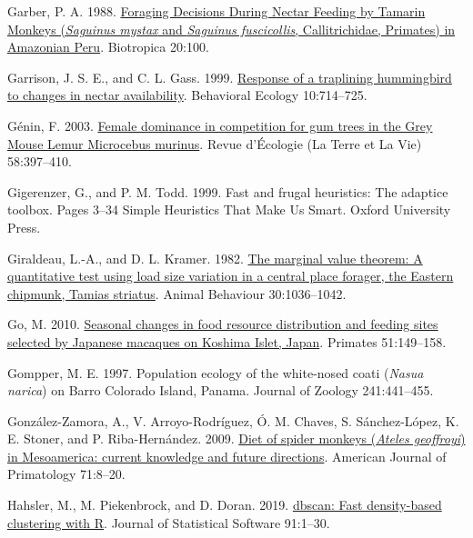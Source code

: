 \documentclass[twoside,12pt,final]{ucthesis-CA2012}
\newenvironment{CSLReferences}%
  {}%
  {\par}
\begin{document}
\begin{ucmainmatter}
\begin{CSLReferences}{1}{0}
\leavevmode{}%
Garber, P. A. 1988. \href{https://doi.org/10.2307/2388181}{Foraging Decisions During Nectar Feeding by Tamarin Monkeys (\emph{Saguinus mystax} and \emph{Saguinus fuscicollis}, Callitrichidae, Primates) in Amazonian Peru}. Biotropica 20:100.

\leavevmode{}%
Garrison, J. S. E., and C. L. Gass. 1999. \href{https://doi.org/10.1093/beheco/10.6.714}{Response of a traplining hummingbird to changes in nectar availability}. Behavioral Ecology 10:714--725.

\leavevmode{}%
Génin, F. 2003. \href{https://doi.org/10.3406/revec.2003.5340}{Female dominance in competition for gum trees in the Grey Mouse Lemur Microcebus murinus}. Revue d'Écologie (La Terre et La Vie) 58:397--410.

\leavevmode{}%
Gigerenzer, G., and P. M. Todd. 1999. Fast and frugal heuristics: The adaptice toolbox. Pages 3--34 Simple Heuristics That Make Us Smart. Oxford University Press.

\leavevmode{}%
Giraldeau, L.-A., and D. L. Kramer. 1982. \href{https://doi.org/10.1016/S0003-3472(82)80193-0}{The marginal value theorem: A quantitative test using load size variation in a central place forager, the Eastern chipmunk, Tamias striatus}. Animal Behaviour 30:1036--1042.

\leavevmode{}%
Go, M. 2010. \href{https://doi.org/10.1007/s10329-009-0179-5}{Seasonal changes in food resource distribution and feeding sites selected by Japanese macaques on Koshima Islet, Japan}. Primates 51:149--158.

\leavevmode{}%
Gompper, M. E. 1997. Population ecology of the white-nosed coati (\emph{Nasua narica}) on Barro Colorado Island, Panama. Journal of Zoology 241:441--455.

\leavevmode{}%
González-Zamora, A., V. Arroyo-Rodríguez, Ó. M. Chaves, S. Sánchez-López, K. E. Stoner, and P. Riba-Hernández. 2009. \href{https://doi.org/10.1002/ajp.20625}{Diet of spider monkeys (\emph{Ateles geoffroyi}) in Mesoamerica: current knowledge and future directions}. American Journal of Primatology 71:8--20.

\leavevmode{}%
Hahsler, M., M. Piekenbrock, and D. Doran. 2019. \href{https://doi.org/10.18637/jss.v091.i01}{{dbscan}: Fast density-based clustering with R}. Journal of Statistical Software 91:1--30.


\end{CSLReferences}
\end{ucmainmatter}
\end{document}
